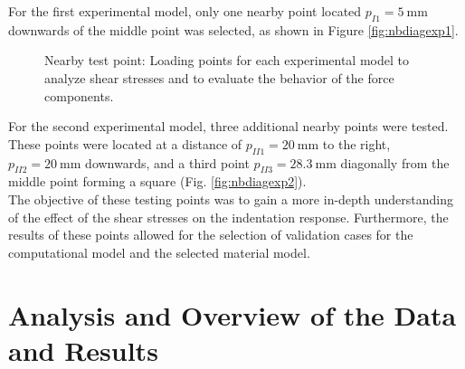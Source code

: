 For the first experimental model, only one nearby point located $p_{I1} = \SI{5}{\milli \m}$ 
downwards of the middle point was selected, as shown in Figure \ref{fig:nbdiagexp1}.

\begin{figure}%
    \centering
   \qquad
   \caption[Nearby point test positions]{Nearby test point: Loading points for each experimental model to analyze shear stresses and to evaluate the behavior of the force components.}%
   \label{fig:nbexp}%
\end{figure}

For the second experimental model, three additional nearby points were tested. 
These points were located at a distance of $p_{II1} = \SI{20}{\milli \m}$ to the 
right, $p_{II2} = \SI{20}{\milli \m}$ downwards, and a third point $p_{II3} = \SI{28.3}{\milli \m}$ 
diagonally from the middle point forming a square (Fig. \ref{fig:nbdiagexp2}). \\

The objective of these testing points was to gain a more in-depth understanding of the effect of 
the shear stresses on the indentation response. Furthermore, 
the results of these points allowed for the selection of validation cases for the 
computational model and the selected material model.

\section{Analysis and Overview of the Data and Results}
\label{section:expresult}


